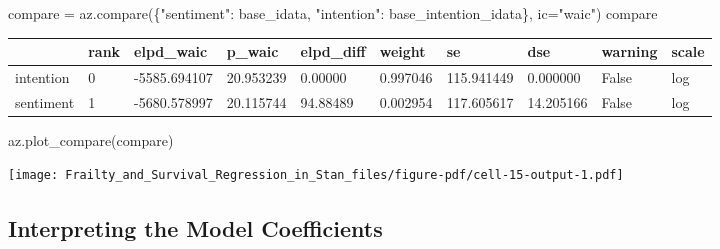 \documentclass[
  letterpaper,
  DIV=11,
  numbers=noendperiod]{scrartcl}
\newenvironment{Shaded}{\begin{snugshade}}{\end{snugshade}}
\newcommand{\NormalTok}[1]{\textcolor[rgb]{0.00,0.23,0.31}{#1}}
\newcommand{\OperatorTok}[1]{\textcolor[rgb]{0.37,0.37,0.37}{#1}}
\newcommand{\StringTok}[1]{\textcolor[rgb]{0.13,0.47,0.30}{#1}}
\begin{document}
\begin{Shaded}
\begin{Highlighting}[]
\NormalTok{compare }\OperatorTok{=}\NormalTok{ az.compare(\{}\StringTok{"sentiment"}\NormalTok{: base\_idata, }\StringTok{"intention"}\NormalTok{: base\_intention\_idata\}, ic}\OperatorTok{=}\StringTok{"waic"}\NormalTok{)}
\NormalTok{compare}
\end{Highlighting}
\end{Shaded}

\begin{longtable}[]{@{}llllllllll@{}}
\toprule\noalign{}
& rank & elpd\_waic & p\_waic & elpd\_diff & weight & se & dse & warning
& scale \\
\midrule\noalign{}
\endhead
\bottomrule\noalign{}
\endlastfoot
intention & 0 & -5585.694107 & 20.953239 & 0.00000 & 0.997046 &
115.941449 & 0.000000 & False & log \\
sentiment & 1 & -5680.578997 & 20.115744 & 94.88489 & 0.002954 &
117.605617 & 14.205166 & False & log \\
\end{longtable}

\begin{Shaded}
\begin{Highlighting}[]
\NormalTok{az.plot\_compare(compare)}
\end{Highlighting}
\end{Shaded}

\texttt{[image: Frailty\_and\_Survival\_Regression\_in\_Stan\_files/figure-pdf/cell-15-output-1.pdf]}

\subsection{Interpreting the Model
Coefficients}\label{interpreting-the-model-coefficients}
\end{document}

